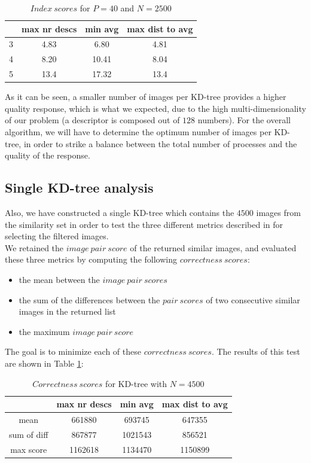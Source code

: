 \begin{table}[H]
\centering
\begin{tabular} {c | c | c | c}
	& max nr descs & min avg & max dist to avg \\
	\hline
	3 & 4.83 & 6.80 & 4.81 \\
	\hline
	4 & 8.20 & 10.41 & 8.04 \\
	\hline
	5 & 13.4 & 17.32 & 13.4 \\
\end{tabular}
\caption{$Index\ scores$ for $P=40$ and $N=2500$}
\end{table}

As it can be seen, a smaller number of images per KD-tree provides a higher quality response, which is what we expected, due to the high multi-dimensionality of our problem (a descriptor is composed out of $128$ numbers).
For the overall algorithm, we will have to determine the optimum number of images per KD-tree, in order to strike a balance between the total number of processes and the quality of the response.\\

\subsection{Single KD-tree analysis}

Also, we have constructed a single KD-tree which contains the $4500$ images from the similarity set in order to test the three different metrics described in  for selecting the filtered images.\\
We retained the $image\ pair\ score$ of the returned similar images, and evaluated these three metrics by computing the following $correctness\ scores$:
\begin{itemize}
	\item the mean between the $image\ pair\ scores$
	\item the sum of the differences between the $pair\ scores$ of two consecutive similar images in the returned list
	\item the maximum $image\ pair\ score$
\end{itemize}
The goal is to minimize each of these $correctness\ scores$.
The results of this test are shown in Table \ref{table:correctness}:\\

\begin{table}[H]
\centering
\begin{tabular} {c | c | c | c}
	& max nr descs & min avg & max dist to avg \\
	\hline
	mean & 661880 & 693745 & 647355 \\
	\hline
	sum of diff & 867877 & 1021543 & 856521 \\
	\hline
	max score & 1162618 & 1134470 & 1150899 \\
\end{tabular}
\caption{$Correctness\ scores$ for KD-tree with $N=4500$}
\label{table:correctness}
\end{table}

